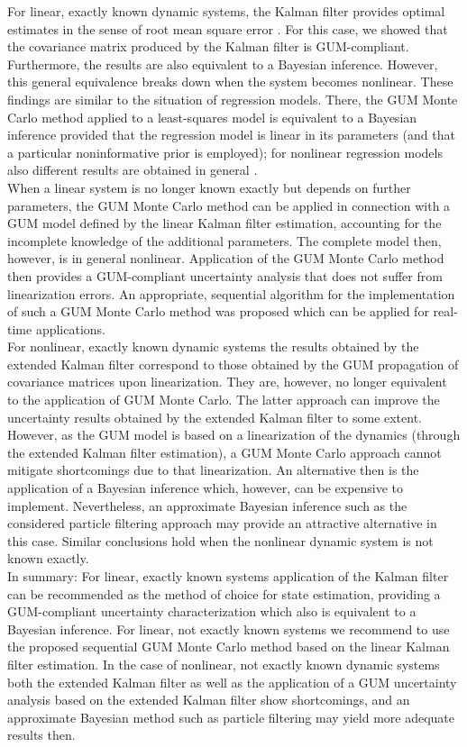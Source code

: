 \documentclass[10pt]{article}
\begin{document}
\begin{spacing}{1}
For linear, exactly known dynamic systems, the Kalman filter provides optimal estimates in the sense of root mean square error \cite{Kalman}. For this case, we showed that the covariance matrix produced by the Kalman filter is GUM-compliant. Furthermore, the results are also equivalent to a Bayesian inference. However,
this general equivalence breaks down when the system becomes nonlinear. These findings are similar to the situation of regression models. There, the GUM Monte Carlo method applied to a least-squares model is equivalent to a Bayesian inference provided that the regression model is linear in its parameters (and that a particular noninformative prior is employed); for nonlinear regression models also different results are obtained in general \cite{Elster:2011jo}.\\

When a linear system is no longer known exactly but depends on further parameters, the GUM Monte Carlo method can be applied in connection with a GUM model defined by the linear Kalman filter estimation, accounting for the incomplete knowledge of the additional parameters. The complete model then, however, is in general nonlinear. Application of the GUM Monte Carlo method then provides a GUM-compliant uncertainty analysis that does not suffer from linearization errors. An appropriate, sequential algorithm for the implementation of such a GUM Monte Carlo method was proposed which can be applied for real-time applications.\\

For nonlinear, exactly known dynamic systems the results obtained by the extended Kalman filter correspond to those obtained by the GUM propagation of covariance matrices upon linearization. They are, however, no longer equivalent to the application of GUM Monte Carlo. The latter approach can improve the uncertainty results obtained by the extended Kalman filter to some extent. However, as the GUM model is based on a linearization of the dynamics (through the extended Kalman filter estimation), a GUM Monte Carlo approach cannot mitigate shortcomings due to that linearization. An alternative then is the application of a Bayesian inference which, however, can be expensive to implement. Nevertheless, an approximate Bayesian inference such as the considered particle filtering approach may provide an attractive alternative in this case. Similar conclusions hold when the nonlinear dynamic system is not known exactly.\\

In summary: For linear, exactly known systems application of the Kalman filter can be recommended as the method of choice for state estimation, providing a GUM-compliant uncertainty characterization which also is equivalent to a Bayesian inference. For linear, not exactly known systems we recommend to use the proposed sequential GUM Monte Carlo method based on the linear Kalman filter estimation. In the case of nonlinear, not exactly known dynamic systems both the extended Kalman filter as well as the application of a GUM uncertainty analysis based on the extended Kalman filter show shortcomings, and an approximate Bayesian method such as particle filtering may yield more adequate results then.


\end{spacing}
\end{document}
